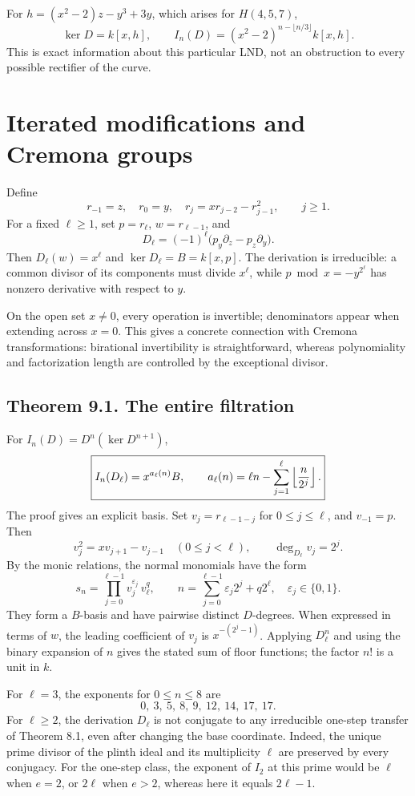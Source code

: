 For $h=(x^2-2)z-y^3+3y$, which arises for $H(4,5,7)$,
\[
\ker D=k[x,h],\qquad I_n(D)=(x^2-2)^{n-\lfloor n/3\rfloor}k[x,h].
\]
This is exact information about this particular LND, not an obstruction to every possible rectifier of the curve.

\section{Iterated modifications and Cremona groups}\label{sec:iterated}
Define
\[
r_{-1}=z,\quad r_0=y,\quad r_j=xr_{j-2}-r_{j-1}^2,\qquad j\ge1.
\]
For a fixed $\ell\ge1$, set $p=r_\ell$, $w=r_{\ell-1}$, and
\[
D_\ell=(-1)^\ell\bigl(p_y\partial_z-p_z\partial_y\bigr).
\]
Then $D_\ell(w)=x^\ell$ and $\ker D_\ell=B=k[x,p]$. The derivation is irreducible: a common divisor of its components must divide $x^\ell$, while $p\bmod x=-y^{2^\ell}$ has nonzero derivative with respect to $y$.

On the open set $x\ne0$, every operation is invertible; denominators appear when extending across $x=0$. This gives a concrete connection with Cremona transformations: birational invertibility is straightforward, whereas polynomiality and factorization length are controlled by the exceptional divisor.

\subsection*{Theorem 9.1. The entire filtration}
For $I_n(D)=D^n(\ker D^{n+1})$,
\[
\boxed{I_n(D_\ell)=x^{a_\ell(n)}B,\qquad
a_\ell(n)=\ell n-\sum_{j=1}^{\ell}\left\lfloor\frac n{2^j}\right\rfloor.}
\]
The proof gives an explicit basis. Set $v_j=r_{\ell-1-j}$ for $0\le j\le\ell$, and $v_{-1}=p$. Then
\[
v_j^2=xv_{j+1}-v_{j-1}\quad(0\le j<\ell),\qquad \deg_{D_\ell}v_j=2^j.
\]
By the monic relations, the normal monomials have the form
\[
s_n=\prod_{j=0}^{\ell-1}v_j^{\varepsilon_j}\,v_\ell^q,
\qquad n=\sum_{j=0}^{\ell-1}\varepsilon_j2^j+q2^\ell,
\quad\varepsilon_j\in\{0,1\}.
\]
They form a $B$-basis and have pairwise distinct $D$-degrees. When expressed in terms of $w$, the leading coefficient of $v_j$ is $x^{-(2^j-1)}$. Applying $D_\ell^n$ and using the binary expansion of $n$ gives the stated sum of floor functions; the factor $n!$ is a unit in $k$.

For $\ell=3$, the exponents for $0\le n\le8$ are
\[
0,\ 3,\ 5,\ 8,\ 9,\ 12,\ 14,\ 17,\ 17.
\]
For $\ell\ge2$, the derivation $D_\ell$ is not conjugate to any irreducible one-step transfer of Theorem 8.1, even after changing the base coordinate. Indeed, the unique prime divisor of the plinth ideal and its multiplicity $\ell$ are preserved by every conjugacy. For the one-step class, the exponent of $I_2$ at this prime would be $\ell$ when $e=2$, or $2\ell$ when $e>2$, whereas here it equals $2\ell-1$.

